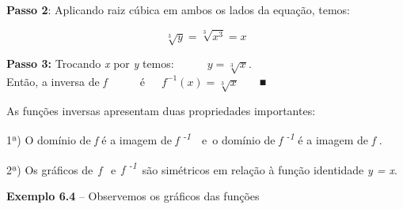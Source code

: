 \documentclass[12pt]{article}
\begin{document}
\begin{enumerate}[label*={\fontsize{14pt}{14pt}\selectfont \textbf{\arabic*.}}]
\begin{justify}
\textbf{Passo 2}: Aplicando raiz cúbica em ambos os lados da equação, temos: 
\end{justify}\par

\begin{adjustwidth}{0.98in}{0.0in}
\begin{justify}
 \[  \]  \[ \sqrt[3]{y}=\sqrt[3]{x^{3}}=x \] 
\end{justify}\par

\end{adjustwidth}

\begin{adjustwidth}{0.79in}{0.0in}
\textbf{Passo 3: }Trocando \textit{x} por \textit{y}  temos:\ \ \ \ \ \   \( y=\sqrt[3]{x}. \)  \[  \]  \[  \] Então, a inversa de \textit{f}\ \ \ \ \ \ é\ \ \    \( f^{-1} \left( x \right) =\sqrt[3]{x} \) \ \ \  ■\par

\end{adjustwidth}

\par 
As funções inversas apresentam duas propriedades importantes:\par


\vspace{\baselineskip}
\begin{adjustwidth}{0.69in}{0.0in}
1ª) O domínio de \textit{f }é a imagem de \textit{f \textsuperscript{-1}}\ \  e\  o domínio de \textit{f \textsuperscript{-1}} é a imagem de \textit{f} .\par

\end{adjustwidth}

\begin{adjustwidth}{0.69in}{0.0in}
2ª) Os gráficos de\  \textit{f }\ e\   \textit{f \textsuperscript{-1}}\  são simétricos em relação à função identidade \textit{y = x}.\  \par

\end{adjustwidth}


\vspace{\baselineskip}
\begin{justify}
\textbf{Exemplo 6.4} – Observemos os gráficos das funções 
\end{justify}\par


\end{enumerate}
\end{document}
